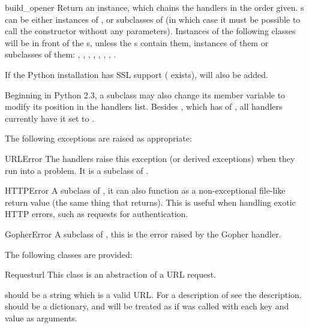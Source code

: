 \begin{funcdesc}{build_opener}{}
Return an  instance, which chains the
handlers in the order given. s can be either instances
of , or subclasses of  (in
which case it must be possible to call the constructor without
any parameters).  Instances of the following classes will be in
front of the s, unless the s contain
them, instances of them or subclasses of them:
, , ,
, ,
, , .

If the Python installation has SSL support (
exists),  will also be added.

Beginning in Python 2.3, a  subclass may also
change its  member variable to modify its
position in the handlers list. Besides , which has
 of , all handlers currently have it
set to .
\end{funcdesc}


The following exceptions are raised as appropriate:

\begin{excdesc}{URLError}
The handlers raise this exception (or derived exceptions) when they
run into a problem.  It is a subclass of .
\end{excdesc}

\begin{excdesc}{HTTPError}
A subclass of , it can also function as a 
non-exceptional file-like return value (the same thing that
 returns).  This is useful when handling exotic
HTTP errors, such as requests for authentication.
\end{excdesc}

\begin{excdesc}{GopherError}
A subclass of , this is the error raised by the
Gopher handler.
\end{excdesc}


The following classes are provided:

\begin{classdesc}{Request}{url}
This class is an abstraction of a URL request.

 should be a string which is a valid URL.  For a description
of  see the  description.
 should be a dictionary, and will be treated as if
 was called with each key and value as arguments.
\end{classdesc}

